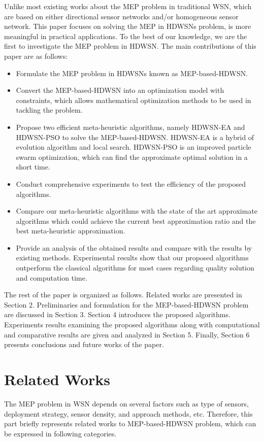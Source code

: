 \documentclass[final]{elsarticle}
\begin{document}
Unlike most existing works about the MEP problem in traditional WSN, which are based on either directional sensor networks and/or homogeneous sensor network. This paper focuses on solving the MEP in HDWSNs problem, is more meaningful in practical applications. To the best of our knowledge, we are the first to investigate the MEP problem in HDWSN. 
The main contributions of this paper are as follows:
\begin{itemize}
	\itemsep0em
	\item Formulate the MEP problem in HDWSNs known as MEP-based-HDWSN.
	\item Convert the MEP-based-HDWSN into an optimization model with constraints, which allows mathematical optimization methods to be used in tackling the problem. 
	\item Propose two efficient meta-heuristic algorithms, namely HDWSN-EA and HDWSN-PSO to solve the MEP-based-HDWSN. HDWSN-EA is a hybrid of evolution algorithm and local search. HDWSN-PSO is an improved particle swarm optimization, which can find the approximate optimal solution in a short time.
	\item Conduct comprehensive experiments to test the efficiency of the proposed algorithms.
	\item Compare our meta-heuristic algorithms with the state of the art approximate algorithms which could achieve the current best approximation ratio and the best meta-heuristic approximation.
	\item Provide an analysis of the obtained results and compare with the results by existing methods. Experimental results show that our proposed algorithms outperform the classical algorithms for most cases regarding quality solution and computation time.	
\end{itemize}

The rest of the paper is organized as follows. Related works are presented in Section 2. Preliminaries and formulation for the MEP-based-HDWSN problem are discussed in Section 3. Section 4 introduces the proposed algorithms. Experiments results examining the proposed algorithms along with computational and comparative results are given and analyzed in Section 5. Finally, Section 6 presents conclusions and future works of the paper.

\section{Related Works}
The MEP problem in WSN depends on several factors such as type of sensors, deployment strategy, sensor density, and approach methods, etc. Therefore, this part briefly represents related works to MEP-based-HDWSN problem, which can be expressed in following categories.
\end{document}
